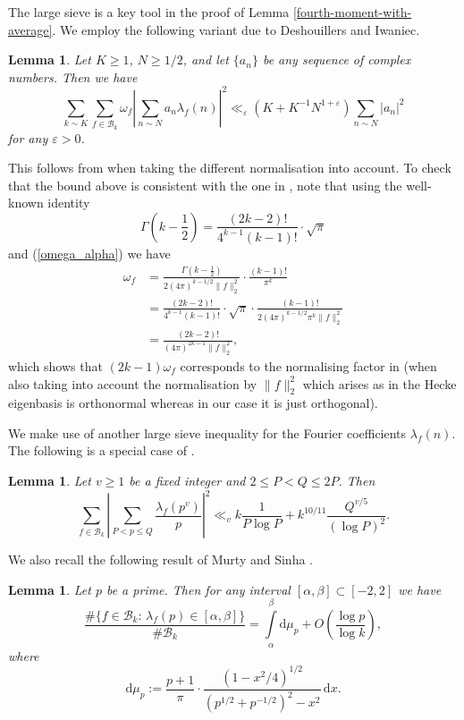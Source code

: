 \documentclass[a4paper,10pt,twoside]{amsart}
\newtheorem{lemma}[theorem]{Lemma}
\theoremstyle{definition}
\numberwithin{equation}{section}
\newcommand\eps{\varepsilon}
\renewcommand\:{\colon}
\begin{document}
The large sieve is a key tool in the proof of Lemma \ref{fourth-moment-with-average}. We employ the following variant due to Deshouillers and Iwaniec.

\begin{lemma}\label{large-sieve}
Let $K\geq 1$, $N\geq 1/2$, and let $\{a_n\}$ be any sequence of complex numbers. Then we have
\[ 
\sum_{k\sim K}\sum_{f\in\mathcal B_k}\omega_f\left|\sum_{n\sim N}a_n\lambda_f(n)\right|^2\ll_\varepsilon\left(K+K^{-1}N^{1+\eps}\right)\sum_{n\sim N}|a_n|^2\]
for any $\varepsilon>0$.
\end{lemma} 
\noindent This follows from \cite[Theorem 2]{DI1982} when taking the different normalisation into account. To check that the bound above is consistent with the one in \cite{DI1982}, note that using the well-known identity
\[ 
\Gamma\left(k-\frac12\right)=\frac{(2k-2)!}{4^{k-1}(k-1)!}\cdot\sqrt\pi\]
and (\ref{omega_alpha}) we have
\begin{align*}
\omega_f&=\frac{\Gamma\left(k-\frac12\right)}{2(4\pi)^{k-1/2}\|f\|_2^2}\cdot\frac{(k-1)!}{\pi^k}\\
&=\frac{(2k-2)!}{4^{k-1}(k-1)!}\cdot\sqrt\pi\cdot\frac{(k-1)!}{2(4\pi)^{k-1/2}\pi^k\|f\|_2^2}\\
&=\frac{(2k-2)!}{(4\pi)^{2k-1}\|f\|_2^2},
\end{align*}
which shows that $(2k-1)\omega_f$ corresponds to the normalising factor in \cite[(1.28)]{DI1982} (when also taking into account the normalisation by $\|f\|_2^2$ which arises as in \cite{DI1982} the Hecke eigenbasis is orthonormal whereas in our case it is just orthogonal).

We make use of another large sieve inequality for the Fourier coefficients $\lambda_f(n)$. The following is a special case of \cite[Theorem 1]{Lau-Wu2008}.

\begin{lemma}\label{large-sieve-2}
Let $v\geq 1$ be a fixed integer and $2\leq P<Q\leq 2P$. Then
\[ 
\sum_{f\in \mathcal B_k}\left|\sum_{P<p\leq Q}\frac{\lambda_f(p^v)}p\right|^2\ll_v k\frac1{P\log P}+k^{10/11}\frac{Q^{v/5}}{(\log P)^2}.\]
\end{lemma}

\noindent We also recall the following result of Murty and Sinha \cite[Theorem 2]{Murty-Sinha2009}.

\begin{lemma}\label{Murty-Sinha}
Let $p$ be a prime. Then for any interval $[\alpha,\beta]\subset[-2,2]$ we have
\[ 
\frac{\#\{f\in \mathcal B_k:\,\lambda_f(p)\in[\alpha,\beta]\}}{\#\mathcal B_k}=\int\limits_\alpha^\beta\mathrm d \mu_p+O\left(\frac{\log p}{\log k}\right),\]
where
\[\mathrm d \mu_p:=\frac{p+1}\pi\cdot\frac{(1-x^2/4)^{1/2}}{\left(p^{1/2}+p^{-1/2}\right)^2-x^2}\,\mathrm d x.\]
\end{lemma}
\end{document}
